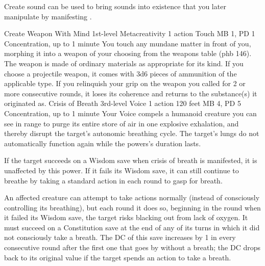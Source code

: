 Create sound can be used to bring sounds into existence that
you later manipulate by manifesting .

\DndPowerHeader%
    {Create Weapon With Mind\label{pwr:create_weapon_with_mind}}
    {1st-level Metacreativity}
    {1 action}
    {Touch}
    {MB 1, PD 1}
    {Concentration, up to 1 minute}
You touch any mundane matter in front of
you, morphing it into a weapon of your choosing from the weapons
table (phb 146). The weapon is made of ordinary materials
as appropriate for its kind. If you choose a projectile weapon,
it comes with 3d6 pieces of ammunition of the applicable type.
If you relinquish your grip on the weapon you called for 2
or more consecutive rounds, it loses its coherence and returns
to the substance(s) it originated as.
\DndPowerHeader%
    {Crisis of Breath\label{pwr:crisis_of_breath}}
    {3rd-level Voice}
    {1 action}
    {120 feet}
    {MB 4, PD 5}
    {Concentration, up to 1 minute}
Your Voice compels a humanoid creature you
can see in range to purge its entire store of air in one explosive
exhalation, and thereby disrupt the target's autonomic breathing
cycle. The target's lungs do not automatically function again
while the powers's duration lasts.

If the target succeeds on a Wisdom save when crisis of breath
is manifested, it is unaffected by this power. If it fails
its Wisdom save, it can still continue to breathe by taking
a standard action in each round to gasp for breath.

An affected creature can attempt to take actions normally
(instead of consciously controlling its breathing), but each
round it does so, beginning in the round when it failed its
Wisdom save, the target risks blacking out from lack of oxygen.
It must succeed on a Constitution save at the end of any of
its turns in which it did not consciously take a breath. The
DC of this save increases by 1 in every consecutive round
after the first one that goes by without a breath; the DC
drops back to its original value if the target spends an action
to take a breath.

